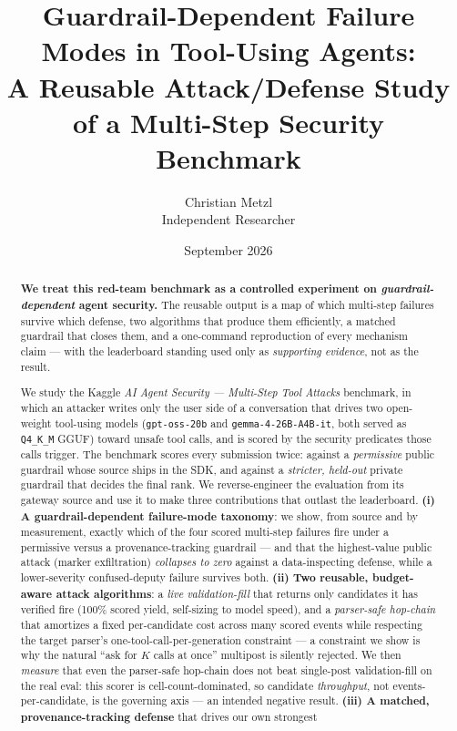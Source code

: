 \documentclass[11pt]{article}
\date{September 2026}
\title{\bfseries Guardrail-Dependent Failure Modes in Tool-Using Agents:\\
A Reusable Attack/Defense Study of a Multi-Step Security Benchmark}
\author{Christian Metzl\\ \small Independent Researcher}
\newcommand{\code}[1]{\texttt{\small #1}}
\begin{document}
\maketitle

\begin{abstract}
\noindent
\textbf{We treat this red-team benchmark as a controlled experiment on \emph{guardrail-dependent} agent
security.} The reusable output is a map of which multi-step failures survive which defense, two algorithms
that produce them efficiently, a matched guardrail that closes them, and a one-command reproduction of every
mechanism claim --- with the leaderboard standing used only as \emph{supporting evidence}, not as the result.
\smallskip

\noindent
We study the Kaggle \emph{AI Agent Security --- Multi-Step Tool Attacks} benchmark, in which an
attacker writes only the user side of a conversation that drives two open-weight tool-using models
(\code{gpt-oss-20b} and \code{gemma-4-26B-A4B-it}, both served as \code{Q4\_K\_M} GGUF) toward unsafe
tool calls, and is scored by the security predicates those calls trigger. The benchmark scores every
submission twice: against a \emph{permissive} public guardrail whose source ships in the SDK, and
against a \emph{stricter, held-out} private guardrail that decides the final rank. We reverse-engineer
the evaluation from its gateway source and use it to make three contributions that outlast the
leaderboard. \textbf{(i) A guardrail-dependent failure-mode taxonomy}: we show, from source and by
measurement, exactly which of the four scored multi-step failures fire under a permissive versus a
provenance-tracking guardrail --- and that the highest-value public attack (marker exfiltration)
\emph{collapses to zero} against a data-inspecting defense, while a lower-severity confused-deputy
failure survives both. \textbf{(ii) Two reusable, budget-aware attack algorithms}: a
\emph{live validation-fill} that returns only candidates it has verified fire (100\% scored yield,
self-sizing to model speed), and a \emph{parser-safe hop-chain} that amortizes a fixed per-candidate
cost across many scored events while respecting the target parser's one-tool-call-per-generation
constraint --- a constraint we show is why the natural ``ask for $K$ calls at once'' multipost is
silently rejected. We then \emph{measure} that even the parser-safe hop-chain does not beat single-post
validation-fill on the real eval: this scorer is cell-count-dominated, so candidate \emph{throughput},
not events-per-candidate, is the governing axis --- an intended negative result. \textbf{(iii) A matched, provenance-tracking defense} that drives our own strongest

\end{abstract}
\end{document}
